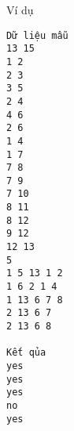 Ví dụ
\begin{verbatim}
Dữ liệu mẫu
13 15
1 2
2 3
3 5
2 4
4 6
2 6
1 4
1 7
7 8
7 9
7 10
8 11
8 12
9 12
12 13
5
1 5 13 1 2
1 6 2 1 4
1 13 6 7 8
2 13 6 7
2 13 6 8

Kết qủa
yes
yes
yes
no
yes
\end{verbatim}